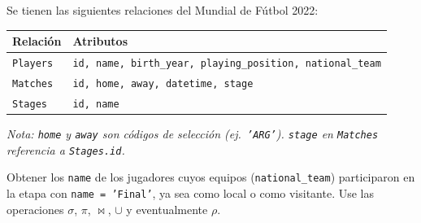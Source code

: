 \documentclass[11pt,a4paper]{article}
\begin{document}
Se tienen las siguientes relaciones del Mundial de Fútbol 2022:

\begin{center}
\begin{tabular}{ll}
\toprule
\textbf{Relación} & \textbf{Atributos} \\
\midrule
\texttt{Players} & \texttt{id, name, birth\_year, playing\_position, national\_team} \\
\texttt{Matches}  & \texttt{id, home, away, datetime, stage} \\
\texttt{Stages}   & \texttt{id, name} \\
\bottomrule
\end{tabular}
\end{center}

\noindent\small\textit{Nota: \texttt{home} y \texttt{away} son códigos de selección (ej.\ \texttt{'ARG'}). \texttt{stage} en \texttt{Matches} referencia a \texttt{Stages.id}.}

\normalsize\vspace{6pt}

Obtener los \texttt{name} de los jugadores cuyos equipos (\texttt{national\_team}) participaron en la etapa con \texttt{name = 'Final'}, ya sea como local o como visitante. Use las operaciones $\sigma$, $\pi$, $\bowtie$, $\cup$ y eventualmente $\rho$.
\end{document}
